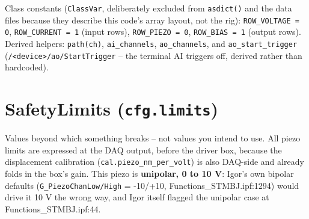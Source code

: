 Class constants (\texttt{Class\discretionary{}{}{}Var}, deliberately excluded from \texttt{asdict()} and the data files because they describe this code's array layout, not the rig): \texttt{ROW\_\discretionary{}{}{}VOLTAGE = 0}, \texttt{ROW\_\discretionary{}{}{}CURRENT = 1} (input rows), \texttt{ROW\_\discretionary{}{}{}PIEZO = 0}, \texttt{ROW\_\discretionary{}{}{}BIAS = 1} (output rows). Derived helpers: \texttt{path(ch)}, \texttt{ai\_\discretionary{}{}{}channels}, \texttt{ao\_\discretionary{}{}{}channels}, and \texttt{ao\_\discretionary{}{}{}start\_\discretionary{}{}{}trigger} (\texttt{/\discretionary{}{}{}<device>/\discretionary{}{}{}ao/\discretionary{}{}{}Start\discretionary{}{}{}Trigger} -- the terminal AI triggers off, derived rather than hardcoded).

\section{SafetyLimits (\texttt{cfg.\discretionary{}{}{}limits})}

Values beyond which something breaks -- not values you intend to use. All piezo limits are expressed at the DAQ output, before the driver box, because the displacement calibration (\texttt{cal.\discretionary{}{}{}piezo\_\discretionary{}{}{}nm\_\discretionary{}{}{}per\_\discretionary{}{}{}volt}) is also DAQ-side and already folds in the box's gain. This piezo is \textbf{unipolar, 0 to 10 V}: Igor's own bipolar defaults (\texttt{G\_\discretionary{}{}{}Piezo\discretionary{}{}{}Chan\discretionary{}{}{}Low/\discretionary{}{}{}High} = -10/+10, Functions\_STMBJ.ipf:1294) would drive it 10 V the wrong way, and Igor itself flagged the unipolar case at Functions\_STMBJ.ipf:44.

